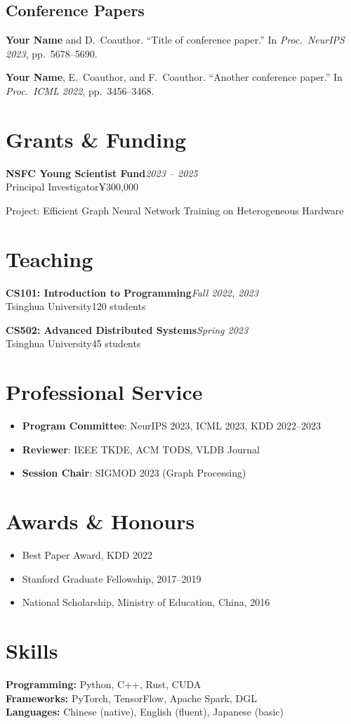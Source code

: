\documentclass[11pt,a4paper]{article}
\newcommand{\cventry}[4]{%
  \textbf{#1}\hfill\textit{#2}\\
  #3\hfill#4\par\smallskip
}
\begin{document}
\subsection{Conference Papers}
\begin{enumerate}[label={[C\arabic*]}]
\item \textbf{Your Name} and D.\ Coauthor. ``Title of conference paper.'' In \textit{Proc.\ NeurIPS 2023}, pp.\ 5678--5690.
\item \textbf{Your Name}, E.\ Coauthor, and F.\ Coauthor. ``Another conference paper.'' In \textit{Proc.\ ICML 2022}, pp.\ 3456--3468.
\end{enumerate}

\section{Grants \& Funding}
\cventry{NSFC Young Scientist Fund}{2023 -- 2025}{Principal Investigator}{¥300,000}
Project: Efficient Graph Neural Network Training on Heterogeneous Hardware

\section{Teaching}
\cventry{CS101: Introduction to Programming}{Fall 2022, 2023}{Tsinghua University}{120 students}
\cventry{CS502: Advanced Distributed Systems}{Spring 2023}{Tsinghua University}{45 students}

\section{Professional Service}
\begin{itemize}
\item \textbf{Program Committee}: NeurIPS 2023, ICML 2023, KDD 2022--2023
\item \textbf{Reviewer}: IEEE TKDE, ACM TODS, VLDB Journal
\item \textbf{Session Chair}: SIGMOD 2023 (Graph Processing)
\end{itemize}

\section{Awards \& Honours}
\begin{itemize}
\item Best Paper Award, KDD 2022
\item Stanford Graduate Fellowship, 2017--2019
\item National Scholarship, Ministry of Education, China, 2016
\end{itemize}

\section{Skills}
\textbf{Programming:} Python, C++, Rust, CUDA\\
\textbf{Frameworks:} PyTorch, TensorFlow, Apache Spark, DGL\\
\textbf{Languages:} Chinese (native), English (fluent), Japanese (basic)

\end{document}
